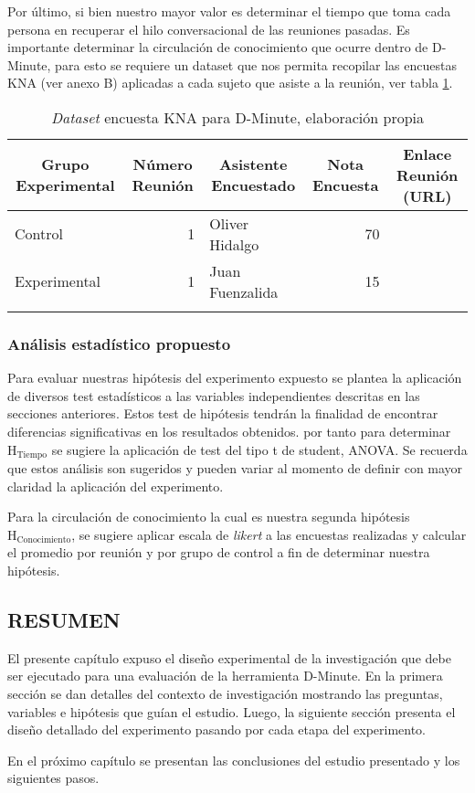 Por último, si bien nuestro mayor valor es determinar el tiempo que toma cada persona en recuperar el hilo conversacional de las reuniones pasadas. Es importante determinar la circulación de conocimiento que ocurre dentro de D-Minute, para esto se requiere un dataset que nos permita recopilar las encuestas KNA (ver anexo B) aplicadas a cada sujeto que asiste a la reunión, ver tabla \ref{tab:dataset2}.

\begin{table}[!h]
\centering
\caption{\textit{Dataset} encuesta KNA para D-Minute, elaboración propia}
\label{tab:dataset2}
\resizebox{15cm}{!} {
\begin{tabular}{|l|r|l|r|l|}
\hline
\multicolumn{1}{|c|}{\textbf{Grupo Experimental}} & \multicolumn{1}{c|}{\textbf{Número Reunión}} & \multicolumn{1}{c|}{\textbf{Asistente Encuestado}} & \multicolumn{1}{c|}{\textbf{Nota Encuesta}} & \multicolumn{1}{c|}{\textbf{Enlace Reunión (URL)}} \\ \hline
Control & 1 & Oliver Hidalgo & 70 &  \\ \hline
Experimental & 1 & Juan Fuenzalida & 15 &  \\ \hline
 &  &  &  &  \\ \hline
\end{tabular}
}
\end{table}

\subsubsection{Análisis estadístico propuesto}

Para evaluar nuestras hipótesis del experimento expuesto se plantea la aplicación de diversos test estadísticos a las variables independientes descritas en las secciones anteriores. Estos test de hipótesis tendrán la finalidad de encontrar diferencias significativas en los resultados obtenidos. por tanto para determinar $\mathrm{H_{Tiempo}}$ se sugiere la aplicación de test del tipo t de student, ANOVA. Se recuerda que estos análisis son sugeridos y pueden variar al momento de definir con mayor claridad la aplicación del experimento. 

Para la circulación de conocimiento la cual es nuestra segunda hipótesis $\mathrm{H_{Conocimiento}}$, se sugiere aplicar escala de \textit{likert} a las encuestas realizadas y calcular el promedio por reunión y por grupo de control a fin de determinar nuestra hipótesis.

\subsection{RESUMEN}

El presente capítulo expuso el diseño experimental de la investigación que debe ser ejecutado para una evaluación de la herramienta D-Minute. En la primera sección se dan detalles del contexto de investigación mostrando las preguntas, variables e hipótesis que guían el estudio. Luego, la siguiente sección presenta el diseño detallado del experimento pasando por cada etapa del experimento. 

En el próximo capítulo se presentan las conclusiones del estudio presentado y los siguientes pasos.
